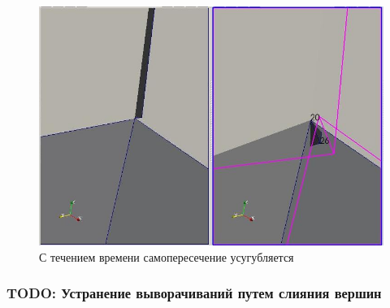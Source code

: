 \documentclass[a4paper,12pt, titlepage]{article}
\begin{document}
\begin{flushleft}
  \begin{figure}[h]
    \includegraphics[clip, width=13cm]{img/consections-5.jpeg}
    \caption{С течением времени самопересечение усугубляется}\label{consections-5}
  \end{figure}
\end{flushleft}





\subsubsection{TODO: Устранение выворачиваний путем слияния вершин}

\end{document}

